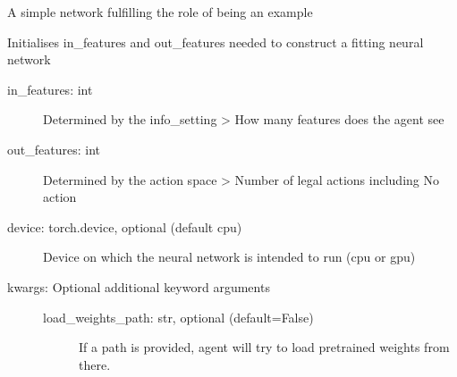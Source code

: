 \documentclass[letterpaper,10pt,english]{sphinxmanual}
\begin{document}
\begin{fulllineitems}
\label{\detokenize{MultiAgentMarketRL:network_models.SimpleExampleNetwork}}
\sphinxAtStartPar
A simple network fulfilling the role of being an example

\begin{fulllineitems}
\label{\detokenize{MultiAgentMarketRL:network_models.SimpleExampleNetwork.__init__}}
\sphinxAtStartPar
Initialises in\_features and out\_features needed to construct a fitting neural network
\begin{description}
\item[{in\_features: int}] \leavevmode
\sphinxAtStartPar
Determined by the info\_setting \textendash{}\textgreater{} How many features does the agent see

\item[{out\_features: int}] \leavevmode
\sphinxAtStartPar
Determined by the action space \textendash{}\textgreater{} Number of legal actions including No action

\item[{device: torch.device, optional (default cpu)}] \leavevmode
\sphinxAtStartPar
Device on which the neural network is intended to run (cpu or gpu)

\item[{kwargs: Optional additional keyword arguments}] \leavevmode\begin{description}
\item[{load\_weights\_path: str, optional (default=False)}] \leavevmode
\sphinxAtStartPar
If a path is provided, agent will try to load pretrained weights from there.

\end{description}


\end{description}
\end{fulllineitems}
\end{fulllineitems}
\end{document}
